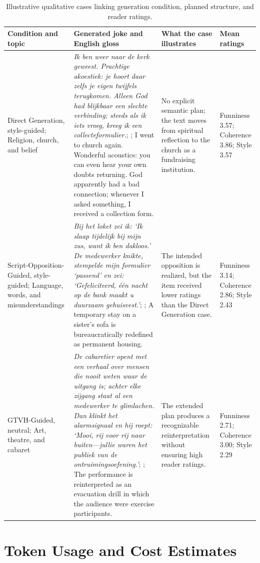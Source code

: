 \documentclass[11pt]{article}
\begin{document}
\begin{table}[t]
\centering
\caption{Illustrative qualitative cases linking generation condition, planned structure, and reader ratings.}\label{tab:qualitative-cases}
\scriptsize\begin{tabularx}{\textwidth}{YYYY}
\toprule\noalign{}
Condition and topic & Generated joke and English gloss & What the case illustrates & Mean ratings \\
\midrule\noalign{}

Direct Generation, style-guided; Religion, church, and belief & \emph{Ik ben weer naar de kerk geweest. Prachtige akoestiek: je hoort daar zelfs je eigen twijfels terugkomen. Alleen God had blijkbaar een slechte verbinding; steeds als ik iets vroeg, kreeg ik een collecteformulier.}; ; I went to church again. Wonderful acoustics: you can even hear your own doubts returning. God apparently had a bad connection; whenever I asked something, I received a collection form. & No explicit semantic plan; the text moves from spiritual reflection to the church as a fundraising institution. & Funniness 3.57; Coherence 3.86; Style 3.57 \\
Script-Opposition-Guided, style-guided; Language, words, and misunderstandings & \emph{Bij het loket zei ik: `Ik slaap tijdelijk bij mijn zus, want ik ben dakloos.' De medewerker knikte, stempelde mijn formulier `passend' en zei: `Gefeliciteerd, één nacht op de bank maakt u duurzaam gehuisvest.'}; ; A temporary stay on a sister's sofa is bureaucratically redefined as permanent housing. & The intended opposition is realized, but the item received lower ratings than the Direct Generation case. & Funniness 3.14; Coherence 2.86; Style 2.43 \\
GTVH-Guided, neutral; Art, theatre, and cabaret & \emph{De cabaretier opent met een verhaal over mensen die nooit weten waar de uitgang is; achter elke zijgang staat al een medewerker te glimlachen. Dan klinkt het alarmsignaal en hij roept: `Mooi, rij voor rij naar buiten---jullie waren het publiek van de ontruimingsoefening.'}; ; The performance is reinterpreted as an evacuation drill in which the audience were exercise participants. & The extended plan produces a recognizable reinterpretation without ensuring high reader ratings. & Funniness 2.71; Coherence 3.00; Style 2.29 \\
\bottomrule
\end{tabularx}\end{table}

\section{Token Usage and Cost Estimates}\label{appendix-f-token-usage-and-cost-estimates}
\end{document}

